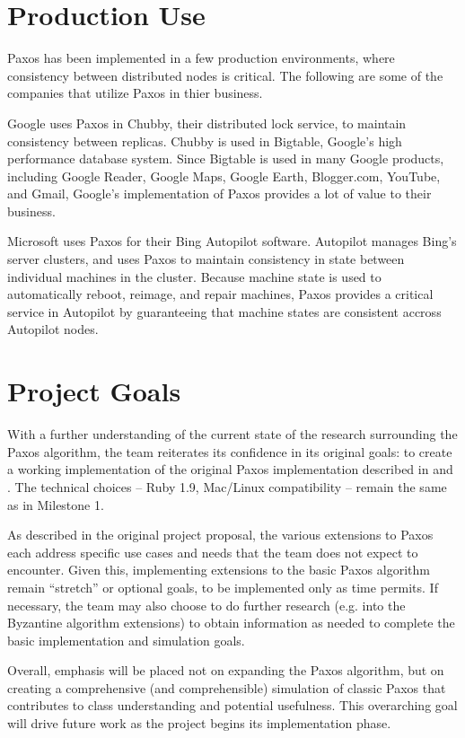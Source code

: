 \documentclass{article}
\begin{document}
\section{Production Use}

Paxos has been implemented in a few production environments, where consistency between distributed nodes is critical. The following are some of the companies that utilize Paxos in thier business.

Google uses Paxos in Chubby, their distributed lock service, to maintain consistency between replicas. Chubby is used in Bigtable, Google's high performance database system. Since Bigtable is used in many Google products, including Google Reader, Google Maps, Google Earth, Blogger.com, YouTube, and Gmail, Google's implementation of Paxos provides a lot of value to their business.

Microsoft uses Paxos for their Bing Autopilot software. Autopilot manages Bing's server clusters, and uses Paxos to maintain consistency in state between individual machines in the cluster. Because machine state is used to automatically reboot, reimage, and repair machines, Paxos provides a critical service in Autopilot by guaranteeing that machine states are consistent accross Autopilot nodes.

\section{Project Goals}

With a further understanding of the current state of the research surrounding the Paxos algorithm, the team reiterates its confidence in its original goals: to create a working implementation of the original Paxos implementation described in \cite{paxos} and \cite{simple-paxos}. The technical choices -- Ruby 1.9, Mac/Linux compatibility -- remain the same as in Milestone 1.

As described in the original project proposal, the various extensions to Paxos each address specific use cases and needs that the team does not expect to encounter. Given this, implementing extensions to the basic Paxos algorithm remain ``stretch'' or optional goals, to be implemented only as time permits. If necessary, the team may also choose to do further research (e.g. into the Byzantine algorithm extensions) to obtain information as needed to complete the basic implementation and simulation goals.

Overall, emphasis will be placed not on expanding the Paxos algorithm, but on creating a comprehensive (and comprehensible) simulation of classic Paxos that contributes to class understanding and potential usefulness. This overarching goal will drive future work as the project begins its implementation phase.



\end{document}
